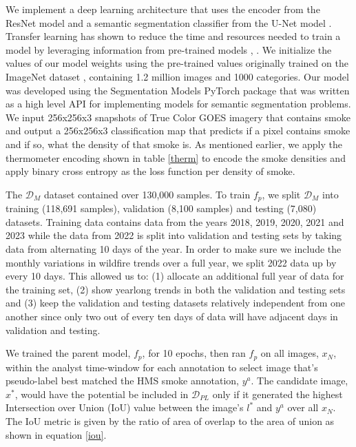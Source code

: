 \documentclass{article}
\begin{document}
We implement a deep learning architecture that uses the encoder from the ResNet model \cite{resnet} and a semantic segmentation classifier from the U-Net model \cite{unet}. Transfer learning has shown to reduce the time and resources needed to train a model by leveraging information from pre-trained models \cite{transfer}, \cite{transfer2}.  We initialize the values of our model weights using the pre-trained values originally trained on the ImageNet dataset \cite{imgnet}, containing 1.2 million images and 1000 categories. Our model was developed using the Segmentation Models PyTorch package \cite{semantic} that was written as a high level API for implementing models for semantic segmentation problems.  We input 256x256x3 snapshots of True Color GOES imagery that contains smoke and output a 256x256x3 classification map that predicts if a pixel contains smoke and if so, what the density of that smoke is. As mentioned earlier, we apply the thermometer encoding shown in table \ref{therm} to encode the smoke densities and apply binary cross entropy as the loss function per density of smoke. 

The \(\mathcal{D}_M\) dataset contained over 130,000 samples. To train \(f_p\), we split \(\mathcal{D}_M\) into training (118,691 samples), validation (8,100 samples) and testing (7,080) datasets. Training data contains data from the years 2018, 2019, 2020, 2021 and 2023 while the data from 2022 is split into validation and testing sets by taking data from alternating 10 days of the year. In order to make sure we include the monthly variations in wildfire trends over a full year, we split 2022 data up by every 10 days. This allowed us to: (1) allocate an additional full year of data for the training set, (2) show yearlong trends in both the validation and testing sets and (3) keep the validation and testing datasets relatively independent from one another since only two out of every ten days of data will have adjacent days in validation and testing.  

We trained the parent model, \(f_p\), for 10 epochs, then ran \(f_p\) on all images, \(x_N\), within the analyst time-window for each annotation to select image that's pseudo-label best matched the HMS smoke annotation, \(y^a\). The candidate image, \(x^*\), would have the potential be included in \(\mathcal{D}_{PL}\) only if it generated the highest Intersection over Union (IoU) value between the image's \(l^*\) and \(y^{a}\) over all \(x_N\). The IoU metric is given by the ratio of area of overlap to the area of union as shown in equation \ref{iou}. 
\end{document}
